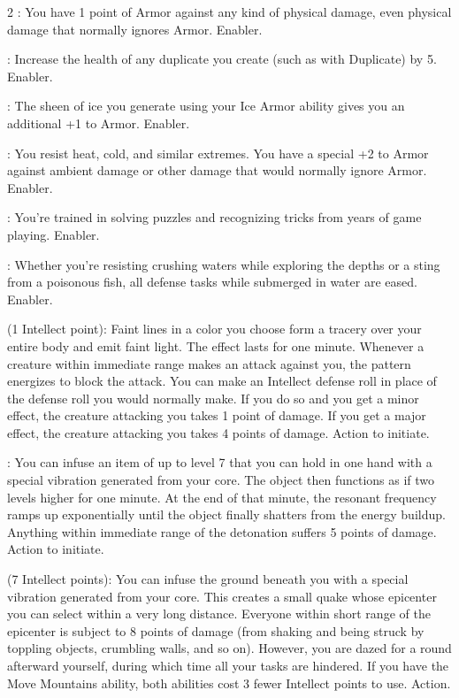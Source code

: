 \begin{multicols}{2}
: You have 1 point of Armor against any kind of physical damage, even physical damage that normally ignores Armor. Enabler. 
 
: Increase the health of any duplicate you create (such as with Duplicate) by 5. Enabler.
 
: The sheen of ice you generate using your Ice Armor ability gives you an additional +1 to Armor. Enabler. 
 
: You resist heat, cold, and similar extremes. You have a special +2 to Armor against ambient damage or other damage that would normally ignore Armor. Enabler. 
 
: You’re trained in solving puzzles and recognizing tricks from years of game playing. Enabler. 
 
: Whether you’re resisting crushing waters while exploring the depths or a sting from a poisonous fish, all defense tasks while submerged in water are eased. Enabler. 
 
 (1 Intellect point): Faint lines in a color you choose form a tracery over your entire body and emit faint light. The effect lasts for one minute. Whenever a creature within immediate range makes an attack against you, the pattern energizes to block the attack. You can make an Intellect defense roll in place of the defense roll you would normally make. If you do so and you get a minor effect, the creature attacking you takes 1 point of damage. If you get a major effect, the creature attacking you takes 4 points of damage. Action to initiate. 
 
: You can infuse an item of up to level 7 that you can hold in one hand with a special vibration generated from your core. The object then functions as if two levels higher for one minute. At the end of that minute, the resonant frequency ramps up exponentially until the object finally shatters from the energy buildup. Anything within immediate range of the detonation suffers 5 points of damage. Action to initiate. 
 
 (7 Intellect points): You can infuse the ground beneath you with a special vibration generated from your core. This creates a small quake whose epicenter you can select within a very long distance. Everyone within short range of the epicenter is subject to 8 points of damage (from shaking and being struck by toppling objects, crumbling walls, and so on). However, you are dazed for a round afterward yourself, during which time all your tasks are hindered. If you have the Move Mountains ability, both abilities cost 3 fewer Intellect points to use. Action. 
 

\end{multicols}
